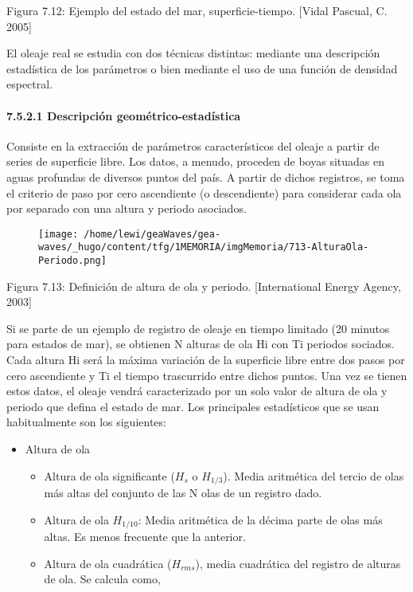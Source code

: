 Figura 7.12: Ejemplo del estado del mar, superficie-tiempo. {[}Vidal
Pascual, C. 2005{]}

El oleaje real se estudia con dos técnicas distintas: mediante una
descripción estadística de los parámetros o bien mediante el uso de una
función de densidad espectral.

\paragraph{7.5.2.1 Descripción
geométrico-estadística}\label{header-n295}

Consiste en la extracción de parámetros característicos del oleaje a
partir de series de superficie libre. Los datos, a menudo, proceden de
boyas situadas en aguas profundas de diversos puntos del país. A partir
de dichos registros, se toma el criterio de paso por cero ascendiente (o
descendiente) para considerar cada ola por separado con una altura y
periodo asociados.

\begin{figure}
\centering
\texttt{[image: /home/lewi/geaWaves/gea-waves/\_hugo/content/tfg/1MEMORIA/imgMemoria/713-AlturaOla-Periodo.png]}
\caption{}
\end{figure}

Figura 7.13: Definición de altura de ola y periodo. {[}International
Energy Agency, 2003{]}

Si se parte de un ejemplo de registro de oleaje en tiempo limitado (20
minutos para estados de mar), se obtienen N alturas de ola Hi con Ti
periodos sociados. Cada altura Hi será la máxima variación de la
superficie libre entre dos pasos por cero ascendiente y Ti el tiempo
trascurrido entre dichos puntos. Una vez se tienen estos datos, el
oleaje vendrá caracterizado por un solo valor de altura de ola y periodo
que defina el estado de mar. Los principales estadísticos que se usan
habitualmente son los siguientes:

\begin{itemize}
\item
  Altura de ola

  \begin{itemize}
  \item
    Altura de ola significante (\(H_s\) o \(H_{1/3}\)). Media aritmética
    del tercio de olas más altas del conjunto de las N olas de un
    registro dado.
  \item
    Altura de ola \(H_{1/10}\): Media aritmética de la décima parte de
    olas más altas. Es menos frecuente que la anterior.
  \item
    Altura de ola cuadrática (\(H_{rms}\)), media cuadrática del
    registro de alturas de ola. Se calcula como, 
  \end{itemize}
\end{itemize}

